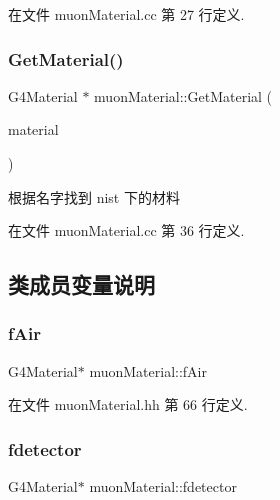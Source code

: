 在文件 muon\+Material.\+cc 第 27 行定义.

\mbox{\label{classmuonMaterial_a86cd49b45dd1042b6ec7aa697197c0b5}} 
\subsubsection{\texorpdfstring{Get\+Material()}{GetMaterial()}}
{\footnotesize\ttfamily G4\+Material $\ast$ muon\+Material\+::\+Get\+Material (\begin{DoxyParamCaption}\item[{const G4\+String}]{material }\end{DoxyParamCaption})}



根据名字找到 nist 下的材料 



在文件 muon\+Material.\+cc 第 36 行定义.



\subsection{类成员变量说明}
\mbox{\label{classmuonMaterial_aad484f194b194516ad00b9c263345639}} 
\subsubsection{\texorpdfstring{f\+Air}{fAir}}
{\footnotesize\ttfamily G4\+Material$\ast$ muon\+Material\+::f\+Air\hspace{0.3cm}{\ttfamily [private]}}



在文件 muon\+Material.\+hh 第 66 行定义.

\mbox{\label{classmuonMaterial_ae5df2e697057d4e3c7e22f1152942eb4}} 
\subsubsection{\texorpdfstring{fdetector}{fdetector}}
{\footnotesize\ttfamily G4\+Material$\ast$ muon\+Material\+::fdetector\hspace{0.3cm}{\ttfamily [private]}}



